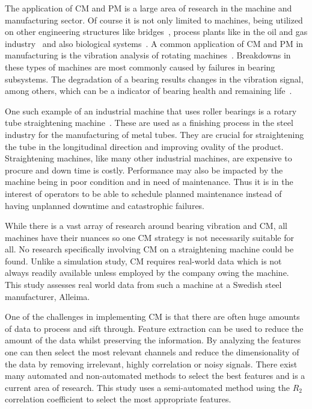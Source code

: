 \documentclass[]{article}
\begin{document}
The application of \gls{CM} and \gls{PM} is a large area of research in the machine and manufacturing sector. Of course it is not only limited to machines, being utilized on other engineering structures like bridges~\cite{buckley2023feature}, process plants like in the oil and gas industry~\cite{telford2011condition} and also biological systems~\cite{tolocsi2011classification}. 
A common application of \gls{CM} and \gls{PM} in manufacturing is the vibration analysis of rotating machines~\cite{tiboni2022review, kateris2014machine}. Breakdowns in these types of machines are most commonly caused by failures in bearing subsystems. The degradation of a bearing results changes in the vibration signal, among others, which can be a indicator of bearing health and remaining life~\cite{zhang2016degradation}. 

One such example of an industrial machine that uses roller bearings is a rotary tube straightening machine~\cite{kato2014straightening, ma2020effect, ma2021analysis, yu2018theoretical, das1991mechanics, yoshimura2009effect, zhang2019modeling}. These are used as a finishing process in the steel industry for the manufacturing of metal tubes. They are crucial for straightening the tube in the longitudinal direction and improving ovality of the product. 
Straightening machines, like many other industrial machines, are expensive to procure and down time is costly. Performance may also be impacted by the machine being in poor condition and in need of maintenance. Thus it is in the interest of operators to be able to schedule planned maintenance instead of having unplanned downtime and catastrophic failures.

While there is a vast array of research around bearing vibration and \gls{CM}, all machines have their nuances so one \gls{CM} strategy is not necessarily suitable for all. No research specifically involving \gls{CM} on a straightening machine could be found. Unlike a simulation study, \gls{CM} requires real-world data which is not always readily available unless employed by the company owing the machine. This study assesses real world data from such a machine at a Swedish steel manufacturer, Alleima.

One of the challenges in implementing \gls{CM} is that there are often huge amounts of data to process and sift through. Feature extraction can be used to reduce the amount of the data whilst preserving the information. By analyzing the features one can then select the most relevant channels and reduce the dimensionality of the data by removing irrelevant, highly correlation or noisy signals. There exist many automated and non-automated methods to select the best features and is a current area of research. This study uses a semi-automated method using the $R_2$ correlation coefficient to select the most appropriate features.
\end{document}

